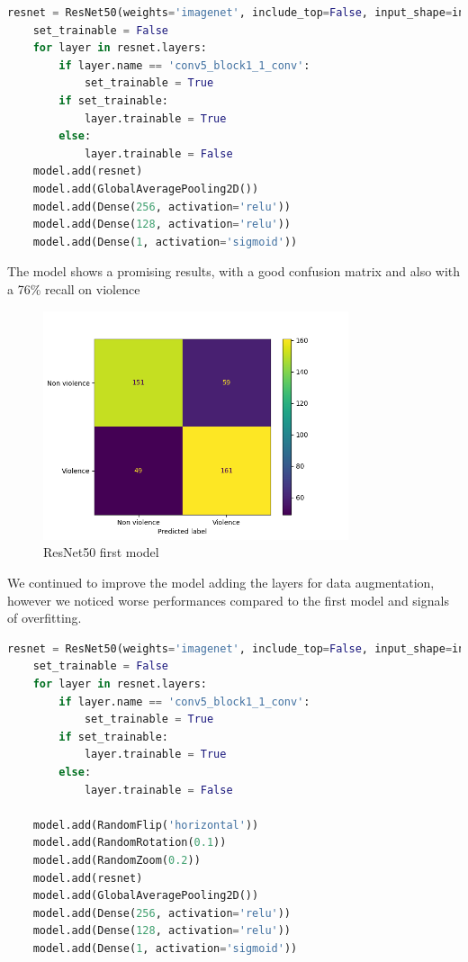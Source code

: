 \begin{lstlisting}[language=python, caption={ResNet50}, label={lst:resnet50Code}]
    resnet = ResNet50(weights='imagenet', include_top=False, input_shape=input_shape)
    set_trainable = False
    for layer in resnet.layers:
        if layer.name == 'conv5_block1_1_conv':
            set_trainable = True
        if set_trainable:
            layer.trainable = True
        else:
            layer.trainable = False
    model.add(resnet)
    model.add(GlobalAveragePooling2D())
    model.add(Dense(256, activation='relu'))
    model.add(Dense(128, activation='relu'))
    model.add(Dense(1, activation='sigmoid'))
\end{lstlisting}

The model shows a promising results, with a good confusion matrix and also with a 76\% recall on violence

\begin{figure}[]
    \centering
    \includegraphics[width=0.8\textwidth]{images/731a-resnet2D1-86ad-conf_matrix.png}
    \caption{ResNet50 first model}
    \label{fig:ResNet2d1}
\end{figure}

We continued to improve the model adding the layers for data augmentation, however we noticed worse performances compared to the first model and signals of overfitting. 
\begin{lstlisting}[language=python, caption={ResNet50 Second Test}, label={lst:resnet50CodeSecondTest}]
    resnet = ResNet50(weights='imagenet', include_top=False, input_shape=input_shape)
    set_trainable = False
    for layer in resnet.layers:
        if layer.name == 'conv5_block1_1_conv':
            set_trainable = True
        if set_trainable:
            layer.trainable = True
        else:
            layer.trainable = False

    model.add(RandomFlip('horizontal'))
    model.add(RandomRotation(0.1))
    model.add(RandomZoom(0.2))
    model.add(resnet)
    model.add(GlobalAveragePooling2D())
    model.add(Dense(256, activation='relu'))
    model.add(Dense(128, activation='relu'))
    model.add(Dense(1, activation='sigmoid'))
\end{lstlisting}

